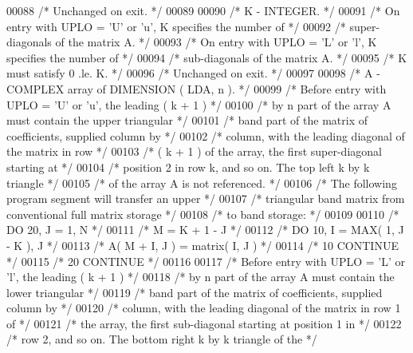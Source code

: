 \begin{DoxyCode}
00088 \textcolor{comment}{/*           Unchanged on exit. */}
00089 
00090 \textcolor{comment}{/*  K      - INTEGER. */}
00091 \textcolor{comment}{/*           On entry with UPLO = 'U' or 'u', K specifies the number of */}
00092 \textcolor{comment}{/*           super-diagonals of the matrix A. */}
00093 \textcolor{comment}{/*           On entry with UPLO = 'L' or 'l', K specifies the number of */}
00094 \textcolor{comment}{/*           sub-diagonals of the matrix A. */}
00095 \textcolor{comment}{/*           K must satisfy  0 .le. K. */}
00096 \textcolor{comment}{/*           Unchanged on exit. */}
00097 
00098 \textcolor{comment}{/*  A      - COMPLEX          array of DIMENSION ( LDA, n ). */}
00099 \textcolor{comment}{/*           Before entry with UPLO = 'U' or 'u', the leading ( k + 1 ) */}
00100 \textcolor{comment}{/*           by n part of the array A must contain the upper triangular */}
00101 \textcolor{comment}{/*           band part of the matrix of coefficients, supplied column by */}
00102 \textcolor{comment}{/*           column, with the leading diagonal of the matrix in row */}
00103 \textcolor{comment}{/*           ( k + 1 ) of the array, the first super-diagonal starting at */}
00104 \textcolor{comment}{/*           position 2 in row k, and so on. The top left k by k triangle */}
00105 \textcolor{comment}{/*           of the array A is not referenced. */}
00106 \textcolor{comment}{/*           The following program segment will transfer an upper */}
00107 \textcolor{comment}{/*           triangular band matrix from conventional full matrix storage */}
00108 \textcolor{comment}{/*           to band storage: */}
00109 
00110 \textcolor{comment}{/*                 DO 20, J = 1, N */}
00111 \textcolor{comment}{/*                    M = K + 1 - J */}
00112 \textcolor{comment}{/*                    DO 10, I = MAX( 1, J - K ), J */}
00113 \textcolor{comment}{/*                       A( M + I, J ) = matrix( I, J ) */}
00114 \textcolor{comment}{/*              10    CONTINUE */}
00115 \textcolor{comment}{/*              20 CONTINUE */}
00116 
00117 \textcolor{comment}{/*           Before entry with UPLO = 'L' or 'l', the leading ( k + 1 ) */}
00118 \textcolor{comment}{/*           by n part of the array A must contain the lower triangular */}
00119 \textcolor{comment}{/*           band part of the matrix of coefficients, supplied column by */}
00120 \textcolor{comment}{/*           column, with the leading diagonal of the matrix in row 1 of */}
00121 \textcolor{comment}{/*           the array, the first sub-diagonal starting at position 1 in */}
00122 \textcolor{comment}{/*           row 2, and so on. The bottom right k by k triangle of the */}

\end{DoxyCode}
